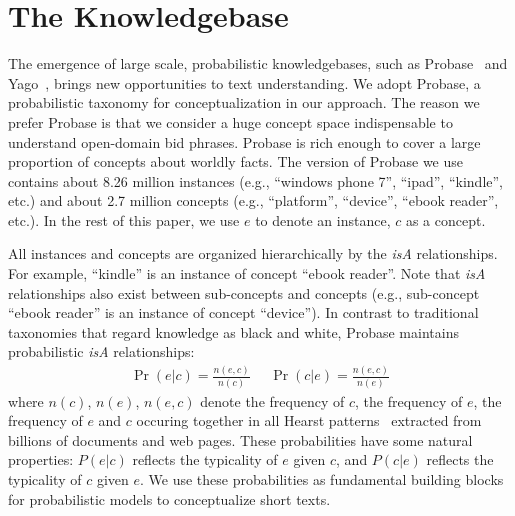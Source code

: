 \section{The Knowledgebase}
\label{sec:knowledge}
The emergence of large scale, probabilistic knowledgebases, such as
Probase~\cite{wu:manyconcepts} and Yago~\cite{SuchanekKW07yago},
brings new opportunities to text understanding.  We adopt Probase, a
probabilistic taxonomy for conceptualization in our approach.  The
reason we prefer Probase is that we consider a huge concept space
indispensable to understand open-domain bid phrases. Probase is rich
enough to cover a large proportion of concepts about worldly facts.
The version of Probase we use contains about 8.26 million instances
(e.g., ``windows phone 7'', ``ipad'', ``kindle'', etc.) and about 2.7
million concepts (e.g., ``platform'', ``device'', ``ebook reader'',
etc.).  In the rest of this paper, we use $e$ to denote an instance, $c$
as a concept.

All instances and concepts are organized hierarchically by the
\emph{isA} relationships.  For example, ``kindle'' is an instance of
concept ``ebook reader''.  Note that \emph{isA} relationships also
exist between sub-concepts and concepts (e.g., sub-concept ``ebook
reader'' is an instance of concept ``device'').  In contrast to
traditional taxonomies that regard knowledge as black and white,
Probase maintains probabilistic \emph{isA} relationships:
\begin{eqnarray}
\Pr(e\vert c)=\frac{n(e,c)}{n(c)}\>\>\>\>\>\> \Pr(c\vert e)=\frac{n(e,c)}{n(e)}
\end{eqnarray}
where $n(c)$, $n(e)$, $n(e,c)$ denote the frequency of $c$, the
frequency of $e$, the frequency of $e$ and $c$ occuring together in all
Hearst patterns~\cite{Hearst92} extracted from billions of documents
and web pages.  These probabilities have some natural properties:
$P(e\vert c)$ reflects the typicality of $e$ given
$c$, and $P(c\vert e)$ reflects the typicality of
$c$ given $e$.  We use these probabilities as fundamental building blocks
for probabilistic models to conceptualize short texts.



